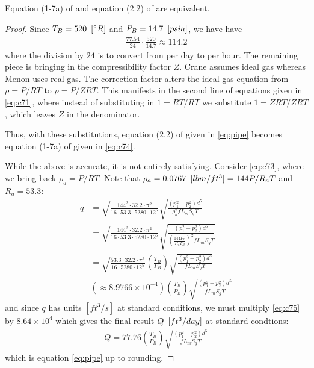 \documentclass{psig_required_latex_files/psig}
\begin{document}
\begin{theorem}
Equation (1-7a) of \cite[Chapter 1]{crane1980flow} and equation (2.2) of \cite{GPH} are equivalent.
\end{theorem}
\begin{proof}
Since $T_B = 520 \enskip [^\circ R]$ and $P_B = 14.7 \enskip [psia]$, we have have
\begin{align*}
\frac{77.54}{24}\cdot\frac{520}{14.7} \approx 114.2
\end{align*}
where the division by $24$ is to convert from per day to per hour.  The remaining piece is bringing in the compressibility factor $Z$.  Crane assumes ideal gas whereas Menon uses real gas.  The correction factor alters the ideal gas equation from $\rho = P/RT$ to $\rho = P/ZRT$.  This manifests in the second line of equations given in \eqref{eq:c71}, where instead of substituting in $1 = RT/RT$ we substitute  $1 = ZRT/ZRT$, which leaves $Z$ in the denominator.

Thus, with these substitutions, equation (2.2) of \cite[Chapter 2]{GPH} given in \eqref{eq:pipe} becomes equation (1-7a) of \cite[Chapter 1]{crane1980flow} given in \eqref{eq:c74}.  

While the above is accurate, it is not entirely satisfying. Consider \eqref{eq:c73}, where we bring back $\rho_a = P/RT$.  Note that $\rho_a = 0.0767 \enskip [lbm/ft^3] = 144 P/R_a T$ and $R_a = 53.3$:
\begin{align}
q &=  \sqrt{\frac{144^2 \cdot 32.2 \cdot \pi^2}{16 \cdot 53.3  \cdot 5280 \cdot 12^5 }} \sqrt{\frac{(p_1^2 - p_2^2) d^5 }{\rho_a^2 f L_m S_g T} } \nonumber \\
&=  \sqrt{\frac{144^2 \cdot 32.2 \cdot \pi^2}{16 \cdot 53.3  \cdot 5280 \cdot 12^5 }} \sqrt{\frac{(p_1^2 - p_2^2) d^5 }{\left(\frac{144 P_B}{R_a T_B} \right)^2 f L_m S_g T} } \nonumber\\
&=   \sqrt{\frac{ 53.3 \cdot 32.2 \cdot \pi^2}{16   \cdot 5280 \cdot 12^5 }}\left( \frac{T_B}{P_B}\right)\sqrt{\frac{(p_1^2 - p_2^2) d^5 }{ f L_m S_g T} } \nonumber\\
&\left(\approx 8.9766\times 10^{-4}\right)\left(\frac{T_B}{P_B}\right)\sqrt{\frac{(p_1^2 - p_2^2) d^5 }{ f L_m S_g T}} \label{eq:c75}
\end{align}
and since $q$ has units $[ft^3/s]$ at standard conditions, we must multiply \eqref{eq:c75} by $8.64 \times 10^4$ which gives the final result $Q \enskip [ft^3/day]$ at standard condtions:
\begin{align}
Q = 77.76\left(\frac{T_B}{P_B}\right)\sqrt{\frac{(p_1^2 - p_2^2) d^5 }{ f L_m S_g T} }
\end{align}
which is equation \eqref{eq:pipe} up to rounding.
\end{proof}
\end{document}
